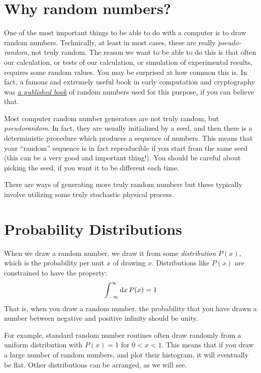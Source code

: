 \section{Why random numbers?}

One of the most important things to be able to do with a computer is
to draw random numbers. Technically, at least in most cases, these are
really {\it pseudo-random}, not truly random. The reason we want to be
able to do this is that often our calculation, or tests of our
calculation, or simulation of experimental results, requires some
random values. You may be surprised at how common this is. In fact, a
famous and extremely useful book in early computation and cryptography
was
\href{https://en.wikipedia.org/wiki/A_Million_Random_Digits_with_100,000_Normal_Deviates}{\it
  a published book} of random numbers used for this purpose, if you
can believe that.

Most computer random number generators are not truly random, but {\it
  pseudorandom}. In fact, they are usually initialized by a seed, and
then there is a deterministic procedure which produces a sequence of
numbers. This means that your ``random'' sequence is in fact
reproducible if you start from the same seed (this can be a very good
and important thing!). You should be careful about picking the seed,
if you want it to be different each time.

There are ways of generating more truly random numbers but these
typically involve utilizing some truly stochastic physical process.

\section{Probability Distributions}

When we draw a random number, we draw it from some {\it distribution}
$P(x)$, which is the probability per unit $x$ of drawing
$x$. Distributions like $P(x)$ are constrained to have the property:
\begin{equation}
\int_{-\infty}^{\infty} {\rm d}x\,P(x) = 1
\end{equation}
That is, when you draw a random number, the probability that you
have drawn a number between negative and positive infinity should be
unity.

For example, standard random number routines often draw randomly from
a uniform distribution with $P(x) = 1$ for $0<x<1$. This means that if
you draw a large number of random numbers, and plot their histogram,
it will eventually be flat. Other distributions can be arranged, as we
will see.

